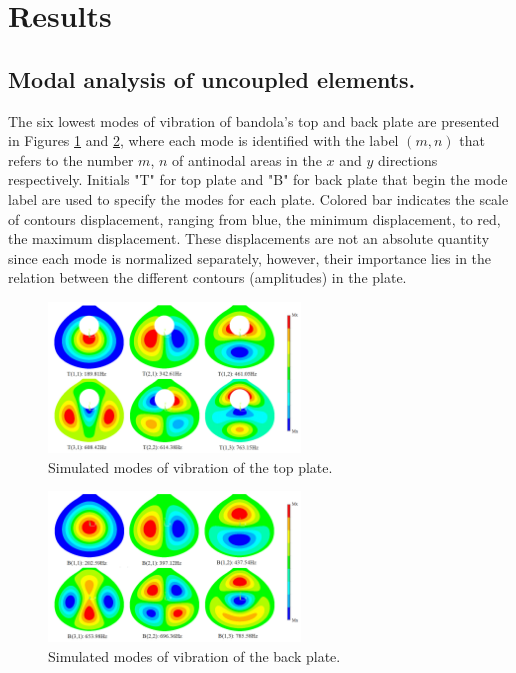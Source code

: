 \section{Results}

\subsection{Modal analysis of uncoupled elements.}

The six lowest modes of vibration of bandola's top and back plate are presented in Figures \ref{TopPlateModes} and \ref{BackPlateModes}, where each mode is identified with the label $(m, n)$ that refers to the number $m$, $n$ of antinodal areas in the $x$ and $y$ directions respectively. Initials "T" for top plate and "B" for back plate that begin the mode label are used to specify the modes for each plate. Colored bar indicates the scale of contours displacement, ranging from blue, the minimum displacement, to red, the maximum displacement. These displacements are not an absolute quantity since each mode is normalized separately, however, their importance lies in the relation between the different contours (amplitudes) in the plate.\\

\begin{figure}[h]
\centering
\includegraphics[height=4cm]{img/TopPlateModes.png}
\caption{Simulated modes of vibration of the top plate.}
\label{TopPlateModes}
\end{figure}

\begin{figure}[h]
\centering
\includegraphics[height=4cm]{img/BackPlateModes.png}
\caption{Simulated modes of vibration of the back plate.}
\label{BackPlateModes}
\end{figure}

